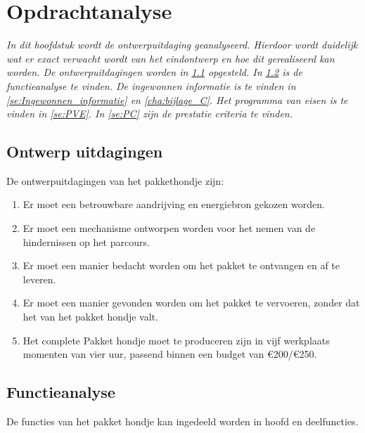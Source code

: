 \chapter{Opdrachtanalyse}
\label{cha:opdrachtanalyse}


\textit{In dit hoofdstuk wordt de ontwerpuitdaging geanalyseerd. Hierdoor wordt duidelijk wat er exact verwacht wordt van het eindontwerp en hoe dit gerealiseerd kan worden. De ontwerpuitdagingen worden in  \cref{se:Ontwerp_uitdagingen} opgesteld. In \cref{se:functieanalyse} is de functieanalyse te vinden. De ingewonnen informatie is te vinden in \cref{se:Ingewonnen_informatie} en \cref{cha:bijlage_C}. Het programma van eisen is te vinden in \cref{se:PVE}. In \cref{se:PC} zijn de prestatie criteria te vinden.}

\section{Ontwerp uitdagingen}
\label{se:Ontwerp_uitdagingen}
De ontwerpuitdagingen van het pakkethondje zijn:

\begin{enumerate}
    \item Er moet een betrouwbare aandrijving en energiebron gekozen worden.
    \item Er moet een mechanisme ontworpen worden voor het nemen van de hindernissen op het parcours.
    \item Er moet een manier bedacht worden om het pakket te ontvangen en af te leveren.
    \item Er moet een manier gevonden worden om het pakket te vervoeren, zonder dat het van het pakket hondje valt.
    \item Het complete Pakket hondje moet te produceren zijn in vijf werkplaats momenten van vier uur, passend binnen een budget van €200/€250.
\end{enumerate}



\section{Functieanalyse}
\label{se:functieanalyse}
De functies van het pakket hondje kan ingedeeld worden in hoofd en deelfuncties.\\
\vspace{\baselineskip}

